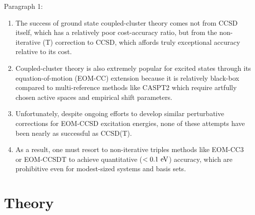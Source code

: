 Paragraph 1:
\begin{enumerate}
    \item
        The success of ground state coupled-cluster theory comes not from CCSD
        itself, which has a relatively poor cost-accuracy ratio, but from the
        non-iterative (T) correction to CCSD, which affords truly exceptional
        accuracy relative to its cost.\cite{Stanton:1997p130}
    \item
        Coupled-cluster theory is also extremely popular for excited states
        through its equation-of-motion (EOM-CC) extension\cite{Krylov:2008p433}
        because it is relatively black-box compared to multi-reference methods
        like CASPT2\cite{Andersson:1992p1218} which require artfully chosen
        active spaces and empirical shift parameters.\cite{Zobel:2017p1482}
    \item
        Unfortunately, despite ongoing efforts to develop similar perturbative
        corrections for EOM-CCSD excitation energies, none of these attempts
        have been nearly as successful as CCSD(T).\cite{Matthews:2016p124102}
    \item
        As a result, one must resort to non-iterative triples methods like
        EOM-CC3\cite{Koch:1998p1808} or EOM-CCSDT\cite{Hirata:2000p255} to
        achieve quantitative (\(<0.1~\mathrm{eV}\)) accuracy, which are prohibitive even
        for modest-sized systems and basis sets.
\end{enumerate}


\section{Theory}

